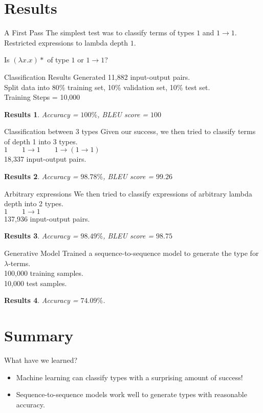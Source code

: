 \documentclass[17pt]{beamer}
\newtheorem{res}{Results}
\begin{document}
\section{Results}

\begin{frame}{A First Pass}
  The simplest test was to classify terms of types $1$ and $1 \to 1$.\\
  Restricted expressions to lambda depth $1$.

  \begin{example}
    Is $(\lambda x. x)*$ of type $1$ or $1 \to 1$?
  \end{example}
\end{frame}

\begin{frame}{Classification Results}
  Generated 11,882 input-output pairs.\\
  Split data into 80\% training set, 10\% validation set, 10\% test set.\\
  Training Steps = 10,000
  \begin{res}
  Accuracy = $100\%$, BLEU score = $100$
  \end{res}
\end{frame}

\begin{frame}{Classification between 3 types}
  Given our success, we then tried to classify terms of depth 1 into
  3 types.\\
  $1 \qquad 1 \to 1 \qquad 1 \to (1 \to 1)$\\
  18,337 input-output pairs.
  \begin{res}
  Accuracy = $98.78\%$, BLEU score = $99.26$
  \end{res}
\end{frame}

\begin{frame}{Arbitrary expressions}
  We then tried to classify expressions of arbitrary lambda depth
  into 2 types.\\
  $1 \qquad 1 \to 1$\\
  137,936 input-output pairs.
  \begin{res}
  Accuracy = $98.49\%$, BLEU score = $98.75$
  \end{res}
\end{frame}

\begin{frame}{Generative Model}
  Trained a sequence-to-sequence model to generate the type for $\lambda$-terms.\\
  100,000 training samples.\\
  10,000 test samples.
  \begin{res}
    Accuracy = $74.09\%$.
  \end{res}
\end{frame}

\section{Summary}

\begin{frame}{What have we learned?}
  \begin{itemize}
  \item Machine learning can classify types with a surprising amount of
    success!
  \item Sequence-to-sequence models work well to generate types with
    reasonable accuracy.
  \end{itemize}
\end{frame}
\end{document}
